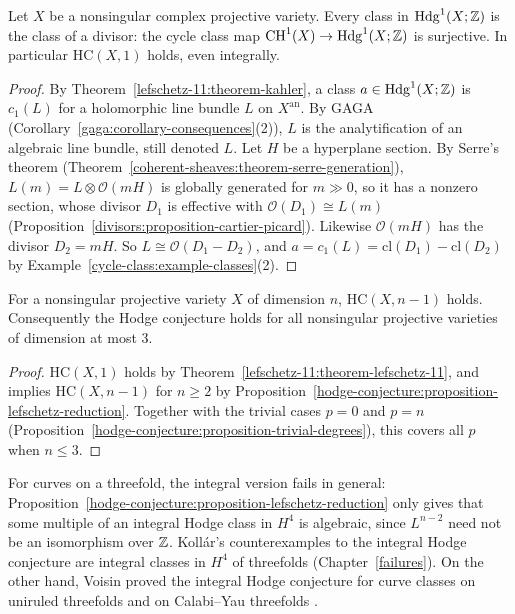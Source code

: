 \begin{theorem}[Lefschetz $(1,1)$]\label{lefschetz-11:theorem-lefschetz-11}
Let $X$ be a nonsingular complex projective variety. Every class in $\mathrm{Hdg}^1(X; \mathbb{Z})$ is the class of a divisor: the cycle class map $\operatorname{CH}^1(X) \to \mathrm{Hdg}^1(X; \mathbb{Z})$ is surjective. In particular
$\mathrm{HC}(X, 1)$ holds, even integrally.
\end{theorem}

\begin{proof}
By Theorem~\ref{lefschetz-11:theorem-kahler}, a class $a \in \mathrm{Hdg}^1(X; \mathbb{Z})$ is $c_1(L)$ for a holomorphic line bundle $L$ on $X^{\mathrm{an}}$. By GAGA
(Corollary~\ref{gaga:corollary-consequences}(2)), $L$ is the analytification of an algebraic line bundle, still denoted $L$. Let $H$ be a hyperplane section. By Serre's theorem
(Theorem~\ref{coherent-sheaves:theorem-serre-generation}), $L(m) = L \otimes \mathcal{O}(mH)$ is globally generated for $m \gg 0$, so it has a nonzero section, whose divisor $D_1$ is effective with
$\mathcal{O}(D_1) \cong L(m)$ (Proposition~\ref{divisors:proposition-cartier-picard}). Likewise $\mathcal{O}(mH)$ has the divisor $D_2 = mH$. So $L \cong \mathcal{O}(D_1 - D_2)$, and
$a = c_1(L) = \mathrm{cl}(D_1) - \mathrm{cl}(D_2)$ by Example~\ref{cycle-class:example-classes}(2).
\end{proof}

\begin{corollary}\label{lefschetz-11:corollary-codimension-n-1}
For a nonsingular projective variety $X$ of dimension $n$, $\mathrm{HC}(X, n - 1)$ holds. Consequently the Hodge conjecture holds for all nonsingular projective varieties of
dimension at most $3$.
\end{corollary}

\begin{proof}
$\mathrm{HC}(X, 1)$ holds by Theorem~\ref{lefschetz-11:theorem-lefschetz-11}, and implies $\mathrm{HC}(X, n - 1)$ for $n \geq 2$ by Proposition~\ref{hodge-conjecture:proposition-lefschetz-reduction}.
Together with the trivial cases $p = 0$ and $p = n$ (Proposition~\ref{hodge-conjecture:proposition-trivial-degrees}), this covers all $p$ when $n \leq 3$.
\end{proof}

\begin{remark}\label{lefschetz-11:remark-integral-curves}
For curves on a threefold, the integral version fails in general: Proposition~\ref{hodge-conjecture:proposition-lefschetz-reduction} only gives that some multiple of an integral Hodge
class in $H^4$ is algebraic, since $L^{n-2}$ need not be an isomorphism over $\mathbb{Z}$. Koll\'ar's counterexamples to the integral Hodge conjecture are integral classes in $H^4$ of threefolds
(Chapter~\ref{failures}). On the other hand, Voisin proved the integral Hodge conjecture for curve classes on uniruled threefolds and on Calabi--Yau threefolds \cite{voisin-2006}.
\end{remark}

